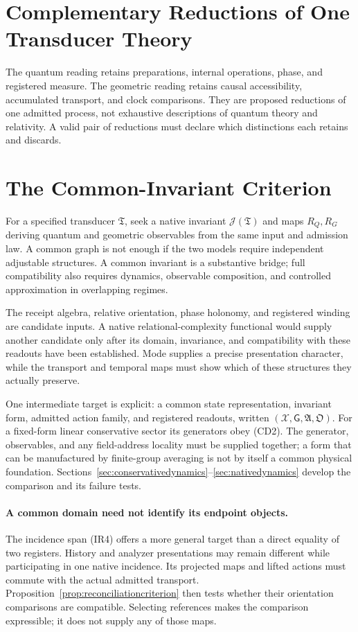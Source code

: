 \section{Complementary Reductions of One Transducer Theory}\label{sec:reductions}
The quantum reading retains preparations, internal operations, phase, and registered measure. The geometric reading retains causal accessibility, accumulated transport, and clock comparisons. They are proposed reductions of one admitted process, not exhaustive descriptions of quantum theory and relativity. A valid pair of reductions must declare which distinctions each retains and discards.

\section{The Common-Invariant Criterion}\label{sec:commoninvariant}
For a specified transducer $\mathfrak T$, seek a native invariant $\mathcal J(\mathfrak T)$ and maps $R_Q,R_G$ deriving quantum and geometric observables from the same input and admission law. A common graph is not enough if the two models require independent adjustable structures. A common invariant is a substantive bridge; full compatibility also requires dynamics, observable composition, and controlled approximation in overlapping regimes.

The receipt algebra, relative orientation, phase holonomy, and registered winding are candidate inputs. A native relational-complexity functional would supply another candidate only after its domain, invariance, and compatibility with these readouts have been established. Mode supplies a precise presentation character, while the transport and temporal maps must show which of these structures they actually preserve.


One intermediate target is explicit: a common state representation, invariant form, admitted action family, and registered readouts, written $(\mathcal X,\mathsf G,\mathfrak A,\mathfrak O)$. For a fixed-form linear conservative sector its generators obey (CD2). The generator, observables, and any field-address locality must be supplied together; a form that can be manufactured by finite-group averaging is not by itself a common physical foundation. Sections~\ref{sec:conservativedynamics}--\ref{sec:nativedynamics} develop the comparison and its failure tests.

\paragraph{A common domain need not identify its endpoint objects.}
The incidence span (IR4) offers a more general target than a direct equality of two registers. History and analyzer presentations may remain different while participating in one native incidence. Its projected maps and lifted actions must commute with the actual admitted transport. Proposition~\ref{prop:reconciliationcriterion} then tests whether their orientation comparisons are compatible. Selecting references makes the comparison expressible; it does not supply any of those maps.

